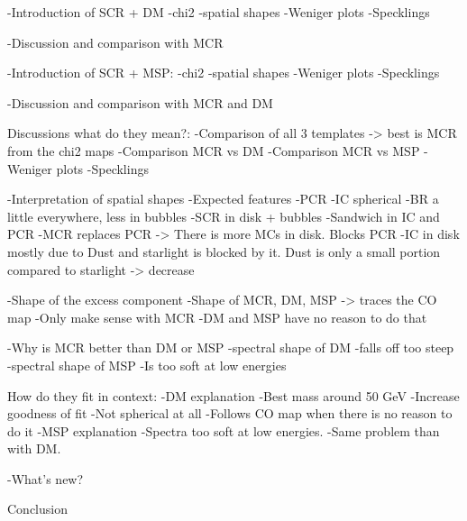 	-Introduction of SCR + DM
		-chi2
		-spatial shapes	
		-Weniger plots
		-Specklings
		
		-Discussion and comparison with MCR

	-Introduction of SCR + MSP:
		-chi2
		-spatial shapes
		-Weniger plots
		-Specklings
		
		-Discussion and comparison with MCR and DM

Discussions what do they mean?:
	-Comparison of all 3 templates -> best is MCR from the chi2 maps
		-Comparison MCR vs DM
		-Comparison MCR vs MSP
		-Weniger plots
		-Specklings
	
	-Interpretation of spatial shapes
		-Expected features
			-PCR			
			-IC spherical
			-BR a little everywhere, less in bubbles			
			-SCR in disk + bubbles
		-Sandwich in IC and PCR
			-MCR replaces PCR -> There is more MCs in disk. Blocks PCR
			-IC in disk mostly due to Dust and starlight is blocked by it. Dust is only a small portion compared to starlight -> decrease
		
		-Shape of the excess component		
			-Shape of MCR, DM, MSP -> traces the CO map
			-Only make sense with MCR
			-DM and MSP have no reason to do that

	
	-Why is MCR better than DM or MSP
		-spectral shape of DM
			-falls off too steep
		-spectral shape of MSP
			-Is too soft at low energies


How do they fit in context:
	-DM explanation
		-Best mass around 50 GeV
		-Increase goodness of fit
		-Not spherical at all
		-Follows CO map when there is no reason to do it
	-MSP explanation
		-Spectra too soft at low energies.
		-Same problem than with DM.
		
	-What's new?
		

Conclusion

